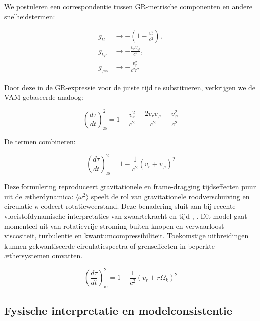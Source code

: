 We postuleren een correspondentie tussen GR-metrische componenten en andere snelheidstermen:

\begin{equation}
\begin{aligned}
g_{tt} &\rightarrow -\left(1 - \frac{v_r^2}{c^2}\right), \\
g_{t\varphi} &\rightarrow -\frac{v_r v_\varphi}{c^2}, \\
g_{\varphi\varphi} &\rightarrow -\frac{v_\varphi^2}{c^2 r^2}
\end{aligned}
\label{eq:VAM_metric_terms}
\end{equation}

Door deze in de GR-expressie voor de juiste tijd te substitueren, verkrijgen we de VAM-gebaseerde analoog:

\begin{equation}
\left( \frac{d\tau}{dt} \right)^2_{\text{\ae}} = 1 - \frac{v_r^2}{c^2} - \frac{2v_r v_\varphi}{c^2} - \frac{v_\varphi^2}{c^2}
\label{eq:VAM_proper_time}
\end{equation}

De termen combineren:

\begin{equation}
\left( \frac{d\tau}{dt} \right)^2_{\text{\ae}} = 1 - \frac{1}{c^2}(v_r + v_\varphi)^2
\label{eq:VAM_proper_time_combined}
\end{equation}

Deze formulering reproduceert gravitationele en frame-dragging tijdseffecten puur uit de ætherdynamica: $\langle \omega^2 \rangle$ speelt de rol van gravitationele roodverschuiving en circulatie $\kappa$ codeert rotatieweerstand. Deze benadering sluit aan bij recente vloeistofdynamische interpretaties van zwaartekracht en tijd \cite{barcelo2011analogue}, \cite{fedi2017gravity}.
Dit model gaat momenteel uit van rotatievrije stroming buiten knopen en verwaarloost viscositeit, turbulentie en kwantumcompressibiliteit. Toekomstige uitbreidingen kunnen gekwantiseerde circulatiespectra of grenseffecten in beperkte æthersystemen omvatten.

\begin{equation}
\boxed{\left( \frac{d\tau}{dt} \right)^2_{\text{\ae}} = 1 - \frac{1}{c^2}(v_r + r\Omega_k)^2}
\label{eq:VAM_proper_time_final}
\end{equation}

\subsection{Fysische interpretatie en modelconsistentie}

